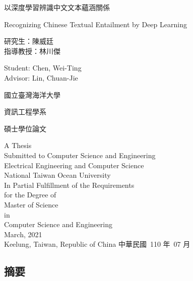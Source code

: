 \documentclass[12pt]{article}
\makeatletter
\newif\if@mainmatter \@mainmattertrue
\newcommand\frontmatter{%
    \cleardoublepage
  \@mainmatterfalse
  \pagenumbering{roman}}
\makeatother
\begin{document}
\begin{CJK*}{UTF8}{bkai}
\begin{titlepage}
  \centering
  {\LARGE 以深度學習辨識中文文本蘊涵關係\par}
  \vfill
  {\Large Recognizing Chinese Textual Entailment by Deep Learning\par}
  \vfill
  {
    \Large
    \begin{minipage}{2in}
      研究生：陳威廷 \\
      指導教授：林川傑
    \end{minipage}
    \hfill
    \begin{minipage}{2.4in}
      Student: Chen, Wei-Ting \\
      Advisor: Lin, Chuan-Jie
    \end{minipage}
    \par
  }
  \vfill
  {\LARGE 國立臺灣海洋大學\par}
  {\LARGE 資訊工程學系\par}
  {\LARGE 碩士學位論文\par}
  \vfill
  {
    \LARGE
    A Thesis \\
    Submitted to Computer Science and Engineering \\
    Electrical Engineering and Computer Science \\
    National Taiwan Ocean University \\
    In Partial Fulfillment of the Requirements \\
    for the Degree of \\
    Master of Science \\
    in \\
    Computer Science and Engineering \\
    March, 2021 \\ \vspace{0.5cm}
    Keelung, Taiwan, Republic of China
  }
  \vfill
  {\LARGE 中華民國\ 110 年\ 07 月}
\end{titlepage}
\ClearWallPaper
{}

\newpage

\begin{spacing}{1.77}

\frontmatter
{}
\section*{摘要}

\end{spacing}
\end{CJK*}
\end{document}
